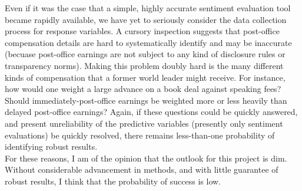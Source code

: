 \documentclass[11pt, letterpaper, twoside]{article}
\begin{document}
        Even if it was the case that a simple, highly accurate sentiment evaluation tool became rapidly available, we have yet to seriously consider the data collection process for response variables. A cursory inspection suggests that post-office compensation details are hard to systematically identify and may be inaccurate (becuase post-office earnings are not subject to any kind of disclosure rules or transparency norms). Making this problem doubly hard is the many different kinds of compensation that a former world leader might receive. For instance, how would one weight a large advance on a book deal against speaking fees? Should immediately-post-office earnings be weighted more or less heavily than delayed post-office earnings? Again, if these questions could be quickly answered, and present unreliability of the predictive variables (presently only  sentiment evaluations) be quickly resolved, there remains less-than-one probability of identifying robust results.\\

        For these reasons, I am of the opinion that the outlook for this project is dim. Without considerable advancement in methods, and with little guarantee of robust results, I think that the probability of success is low. 
    
\end{document}
